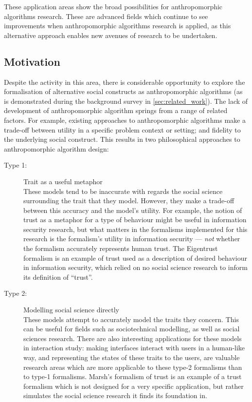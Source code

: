These application areas show the broad possibilities for anthropomorphic algorithms research. These are advanced fields which continue to see improvements when anthropomorphic algorithms research is applied, as this alternative approach enables new avenues of research to be undertaken.\par

\subsection{Motivation}\label{subsec:formalism_types}

Despite the activity in this area, there is considerable opportunity to explore the formalisation of alternative social constructs as anthropomorphic algorithms (as is demonstrated during the background survey in \cref{sec:related_work}). The lack of development of anthropomorphic algorithm springs from a range of related factors. For example, existing approaches to anthropomorphic algorithms make a trade-off between utility in a specific problem context or setting; and fidelity to the underlying social construct. This results in two philosophical approaches to anthropomorphic algorithm design:

\begin{description}
    \item [Type 1: ] Trait as a useful metaphor\\
        These models tend to be inaccurate with regards the social science surrounding the trait that they model. However, they make a trade-off between this accuracy and the model's utility. For example, the notion of trust as a metaphor for a type of behaviour might be useful in information security research, but what matters in the formalisms implemented for this research is the formalism's utility in information security --- \emph{not} whether the formalism accurately represents human trust. The Eigentrust formalism\cite{eigentrust} is an example of trust used as a description of desired behaviour in information security, which relied on no social science research to inform its definition of ``trust''.
\item [Type 2: ] Modelling social science directly\\
    These models attempt to accurately model the traits they concern. This can be useful for fields such as sociotechnical modelling, as well as social sciences research. There are also interesting applications for these models in interaction study: making interfaces interact with users in a human-like way, and representing the states of these traits to the users, are valuable research areas which are more applicable to these type-2 formalisms than to type-1 formalisms. Marsh's formalism of trust\cite{Marsh1994FormalisingConcept} is an example of a trust formalism which is not designed for a very specific application, but rather simulates the social science research it finds its foundation in.
\end{description}

